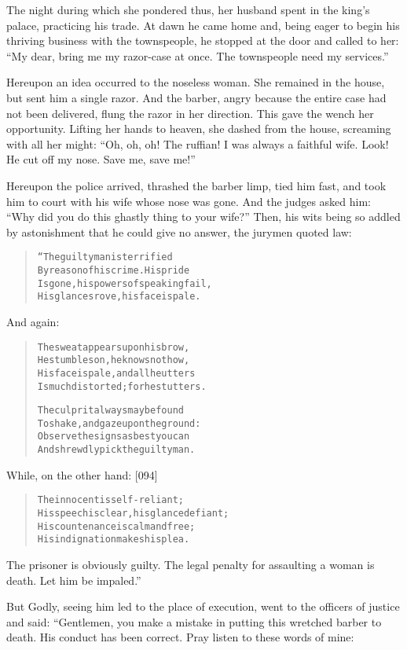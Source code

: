 \documentclass[article, twoside, 14pt]{memoir}
\renewenvironment{verbatim}{%
\begin{quote}%
\vskip -10pt%
\begin{alltt}\normalfont\large}{\end{alltt}%
\end{quote}%
\vskip -10pt
} %
\begin{document}
The night during which she pondered thus, her husband spent in the
king's palace, practicing his trade. At dawn he came home and,
being eager to begin his thriving business with the townspeople, he
stopped at the door and called to her:
``My dear, bring me my razor-case at once. The townspeople need my services.''

Hereupon an idea occurred to the noseless woman. She remained in
the house, but sent him a single razor. And the barber, angry
because the entire case had not been delivered, flung the razor in
her direction. This gave the wench her opportunity. Lifting her
hands to heaven, she dashed from the house, screaming with all her
might:
``Oh, oh, oh! The ruffian! I was always a faithful wife. Look! He cut off my nose. Save me, save me!''

Hereupon the police arrived, thrashed the barber limp, tied him
fast, and took him to court with his wife whose nose was gone. And
the judges asked him:
``Why did you do this ghastly thing to your wife?'' Then, his wits
being so addled by astonishment that he could give no answer, the
jurymen quoted law:

\begin{verbatim}
“The guilty man is terrified
By reason of his crime. His pride
Is gone, his powers of speaking fail,
His glances rove, his face is pale.
\end{verbatim}
And again:

\begin{verbatim}
The sweat appears upon his brow,
He stumbles on, he knows not how,
His face is pale, and all he utters
Is much distorted; for he stutters.

The culprit always may be found
To shake, and gaze upon the ground:
Observe the signs as best you can
And shrewdly pick the guilty man.
\end{verbatim}
While, on the other hand: [094]

\begin{verbatim}
The innocent is self-reliant;
His speech is clear, his glance defiant;
His countenance is calm and free;
His indignation makes his plea.
\end{verbatim}
The prisoner is obviously guilty. The legal penalty for assaulting
a woman is death. Let him be impaled.”

But Godly, seeing him led to the place of execution, went to the
officers of justice and said: “Gentlemen, you make a mistake in
putting this wretched barber to death. His conduct has been
correct. Pray listen to these words of mine:
\end{document}

